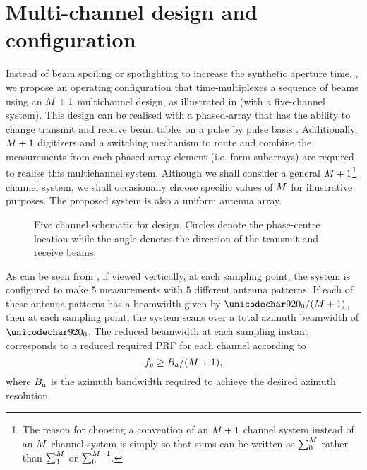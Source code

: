 \section{Multi-channel design and configuration}
\label{sc:multigeometry}
Instead of beam spoiling or spotlighting to increase the synthetic aperture time, \cite{Jakowatz1996}, we propose an operating configuration that time-multiplexes a sequence of beams using an $M + 1$ multichannel design, as illustrated in  (with a five-channel system). This design can be realised with a phased-array that has the ability to change transmit and receive beam tables on a pulse by pulse basis \cite{CalabreseDiego2014, SikanetaGierullTGRS2015}. Additionally, $M + 1$ digitizers and a switching mechanism to route and combine the measurements from each phased-array element (i.e. form subarrays) are required to realise this multichannel system. Although we shall consider a general $M + 1$\footnote{The reason for choosing a convention of an $M + 1$ channel system instead of an $M$ channel system is simply so that sums can be written as $\sum_{0}^{M}$ rather than $\sum_{1}^{M}$ or $\sum_{0}^{M-1}$.} channel system, we shall occasionally choose specific values of $M$ for illustrative purposes. The proposed system is also a uniform antenna array.
\begin{figure}[h!]
\begin{center}
 \resizebox{0.8\columnwidth}{!}{}
 \caption{Five channel schematic for design. Circles denote the phase-centre location while the angle denotes the direction of the transmit and receive beams.}
 \label{fg:fivechan}
 \end{center}
\end{figure}
\par
As can be seen from , if viewed vertically, at each sampling point, the system is configured to make $5$ measurements with $5$ different antenna patterns. If each of these antenna patterns has a beamwidth given by $\threeDBDesired/(\channelM + 1)$, then at each sampling point, the system scans over a total azimuth beamwidth of $\threeDBDesired$. The reduced beamwidth at each sampling instant corresponds to a reduced required PRF for each channel according to
\begin{equation}
 f_p \geq B_a/(M + 1),
\end{equation}
where $B_a$ is the azimuth bandwidth required to achieve the desired azimuth resolution.

